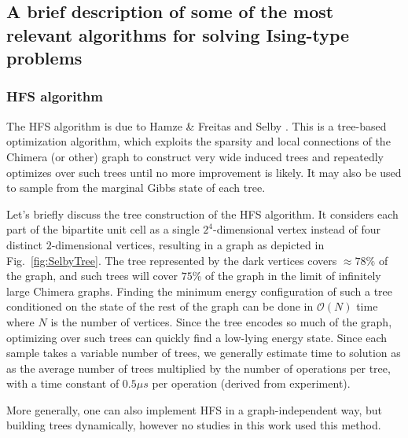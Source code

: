 \subsection{A brief description of some of the most relevant algorithms for solving Ising-type problems}

\subsubsection{HFS algorithm}
The HFS algorithm is due to Hamze \& Freitas \cite{hamze:04} and Selby \cite{Selby:2014tx}. This is a tree-based optimization algorithm, which exploits the sparsity and local connections of the Chimera (or other) graph to construct very wide induced trees and repeatedly optimizes over such trees until no more improvement is likely. It may also be used to sample from the marginal Gibbs state of each tree.

Let's briefly discuss the tree construction of the HFS algorithm.  It considers each part of the bipartite unit cell as a single $2^4$-dimensional vertex instead of four distinct $2$-dimensional vertices, resulting in a graph as depicted in Fig.~\ref{fig:SelbyTree}. The tree represented by the dark vertices covers $\approx 78\%$ of the graph, and such trees will cover $75\%$ of the graph in the limit of infinitely large Chimera graphs. Finding the minimum energy configuration of such a tree conditioned on the state of the rest of the graph can be done in $\mathcal{O} (N)$ time where $N$ is the number of vertices. Since the tree encodes so much of the graph, optimizing over such trees can quickly find a low-lying energy state. Since each sample takes a variable number of trees, we generally estimate time to solution as as the average number of trees multiplied by the number of operations per tree, with a time constant of $0.5\mu s$ per operation (derived from experiment).

More generally, one can also implement HFS in a graph-independent way, but building trees dynamically, however no studies in this work used this method.

